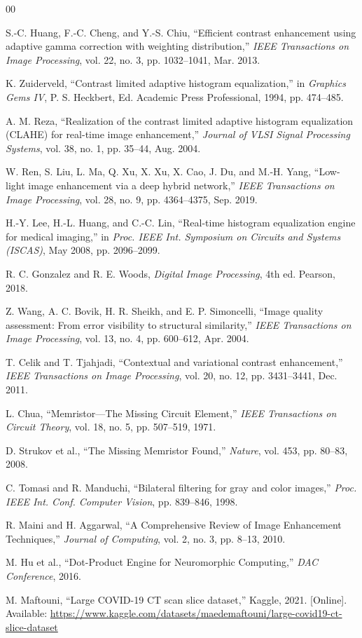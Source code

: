 \documentclass[conference]{IEEEtran}
\begin{document}
\begin{thebibliography}{00}

S.-C. Huang, F.-C. Cheng, and Y.-S. Chiu, ``Efficient contrast enhancement using adaptive gamma correction with weighting distribution,'' \textit{IEEE Transactions on Image Processing}, vol. 22, no. 3, pp. 1032--1041, Mar. 2013.

K. Zuiderveld, ``Contrast limited adaptive histogram equalization,'' in \textit{Graphics Gems IV}, P. S. Heckbert, Ed. Academic Press Professional, 1994, pp. 474--485.

A. M. Reza, ``Realization of the contrast limited adaptive histogram equalization (CLAHE) for real-time image enhancement,'' \textit{Journal of VLSI Signal Processing Systems}, vol. 38, no. 1, pp. 35--44, Aug. 2004.

W. Ren, S. Liu, L. Ma, Q. Xu, X. Xu, X. Cao, J. Du, and M.-H. Yang, ``Low-light image enhancement via a deep hybrid network,'' \textit{IEEE Transactions on Image Processing}, vol. 28, no. 9, pp. 4364--4375, Sep. 2019.

H.-Y. Lee, H.-L. Huang, and C.-C. Lin, ``Real-time histogram equalization engine for medical imaging,'' in \textit{Proc. IEEE Int. Symposium on Circuits and Systems (ISCAS)}, May 2008, pp. 2096--2099.

R. C. Gonzalez and R. E. Woods, \textit{Digital Image Processing}, 4th ed. Pearson, 2018.

Z. Wang, A. C. Bovik, H. R. Sheikh, and E. P. Simoncelli, ``Image quality assessment: From error visibility to structural similarity,'' \textit{IEEE Transactions on Image Processing}, vol. 13, no. 4, pp. 600--612, Apr. 2004.

T. Celik and T. Tjahjadi, ``Contextual and variational contrast enhancement,'' \textit{IEEE Transactions on Image Processing}, vol. 20, no. 12, pp. 3431--3441, Dec. 2011.

L. Chua, ``Memristor—The Missing Circuit Element,'' \textit{IEEE Transactions on Circuit Theory}, vol. 18, no. 5, pp. 507–519, 1971.

D. Strukov et al., ``The Missing Memristor Found,'' \textit{Nature}, vol. 453, pp. 80–83, 2008.

C. Tomasi and R. Manduchi, ``Bilateral filtering for gray and color images,'' \textit{Proc. IEEE Int. Conf. Computer Vision}, pp. 839--846, 1998.

R. Maini and H. Aggarwal, ``A Comprehensive Review of Image Enhancement Techniques,'' \textit{Journal of Computing}, vol. 2, no. 3, pp. 8--13, 2010.

M. Hu et al., ``Dot-Product Engine for Neuromorphic Computing,'' \textit{DAC Conference}, 2016.

M. Maftouni, ``Large COVID-19 CT scan slice dataset,'' Kaggle, 2021. [Online]. Available: \url{https://www.kaggle.com/datasets/maedemaftouni/large-covid19-ct-slice-dataset}

\end{thebibliography}
\end{document}
